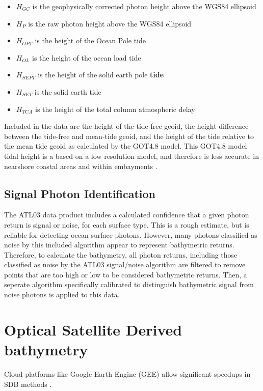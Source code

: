 \begin{itemize}

      \item \(H_{GC}\) is the geophysically corrected photon height above the WGS84 ellipsoid
      \item \(H_{P}\) is the raw photon height above the WGS84 ellipsoid
      \item \(H_{OPT}\) is the height of the Ocean Pole tide
      \item \(H_{OL}\) is the height of the ocean load tide
      \item \(H_{SEPT}\) is the height of the solid earth pole \textbf{tide}
      \item \(H_{SET}\) is the solid earth tide
      \item \(H_{TCA}\) is the height of the total column atmospheric delay
\end{itemize}

Included in the data are the height of the tide-free geoid, the height difference between the tide-free and mean-tide geoid, and the height of the tide relative to the mean tide geoid as calculated by the GOT4.8 model. This GOT4.8 model tidal height is a based on a low resolution model, and therefore is less accurate in nearshore coastal areas and within embayments \parencite{Neumann2019e}.

\subsection{Signal Photon Identification}

The ATL03 data product includes a calculated confidence that a given photon return is signal or noise, for each surface type. This is a rough estimate, but is reliable for detecting ocean surface photons. However, many photons classified as noise by this included algorithm appear to represent bathymetric returns. Therefore, to calculate the bathymetry, all photon returns, including those classified as noise by the ATL03 signal/noise algorithm are filtered to remove points that are too high or low to be considered bathymetric returns. Then, a seperate algorithm specifically calibrated to distinguish bathymetric signal from noise photons is applied to this data.

\section{Optical Satellite Derived bathymetry}

Cloud platforms like Google Earth Engine (GEE) \parencite{Gorelick2017a} allow significant speedups in SDB methods \parencite{Pike2019}. 



